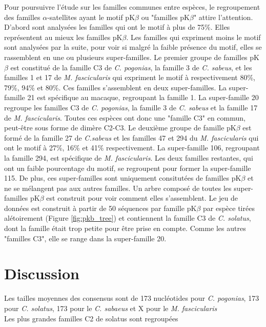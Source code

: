 \documentclass[12pt,a4paper]{article}
\begin{document}
	Pour poursuivre l'étude sur les familles communes entre espèces, le regroupement des familles $\alpha$-satellites ayant  le motif pK$\beta$ ou "familles pK$\beta$" attire l'attention. D'abord sont analysées les familles qui ont le motif à plus de 75\%. Elles représentent au mieux les familles pK$\beta$. Les familles qui expriment moins le motif sont analysées par la suite, pour voir si malgré la faible présence du motif, elles se rassemblent en une ou plusieurs super-familles.
	Le premier groupe de familles pK$\beta$ est constitué de la famille C3 de \textit{C. pogonias}, la famille 3 de \textit{C. sabeus}, et les familles 1 et 17 de \textit{M. fascicularis} qui expriment le motif à respectivement 80\%, 79\%, 94\% et 80\%. Ces familles s'assemblent en deux super-familles. La super-famille 21 est spécifique au macaque, regroupant la famille 1. La super-famille 20 regroupe les familles C3 de \textit{C. pogonias}, la famille 3 de \textit{C. sabeus} et la famille 17 de \textit{M. fascicularis}. Toutes ces espèces ont donc une "famille C3" en commun, peut-être sous forme de dimère C2-C3. Le deuxième groupe de famille pK$\beta$ est formé de la famille 27 de  \textit{C.sabeus} et les familles  47 et 294 du \textit{M. fascicularis} qui ont le motif à 27\%, 16\% et 41\% respectivement. La super-famille 106, regroupant la famille 294, est spécifique de \textit{M. fascicularis}. Les deux familles restantes, qui ont un faible pourcentage du motif, se regroupent pour former la super-famille 115. De plus, ces super-familles sont uniquement consitutées de familles pK$\beta$ et ne se mélangent pas aux autres familles.
	Un arbre composé de toutes les super-familles pK$\beta$ est construit pour voir comment elles s'assemblent. Le jeu de données est construit à partir de 50 séquences par famille pK$\beta$ par espèce tirées alétoirement (Figure \ref{fig:pkb_tree}) et contiennent la famille C3 de \textit{C. solatus}, dont la famille était trop petite pour être prise en compte. Comme les autres "familles C3", elle se range dans la super-famille 20. 

\section{Discussion}

	Les tailles moyennes des consensus sont de 173 nucléotides pour \textit{C. pogonias}, 173 pour \textit{C. solatus}, 173 pour le \textit{C. sabaeus} et X pour le \textit{M. fascicularis}\\
	
	Les plus grandes familles C2 de solatus sont regroupées\\
\end{document}
